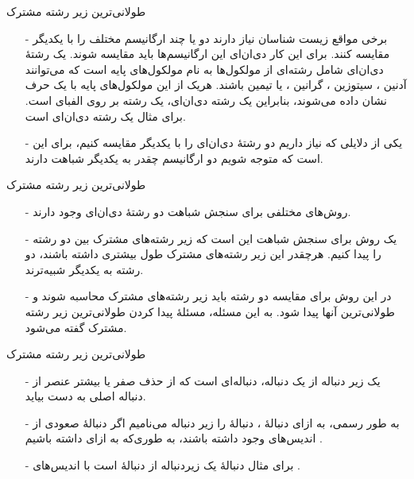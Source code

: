 
\begin{frame}{‌طولانی‌ترین زیر رشته مشترک}
\begin{itemize}\itemr
\item[-]
برخی مواقع زیست شناسان نیاز دارند دو یا چند ارگانیسم مختلف را با یکدیگر مقایسه کنند. برای این کار دی‌ان‌ای این ارگانیسم‌ها باید مقایسه شوند. یک رشتهٔ دی‌ان‌ای شامل رشته‌ای از مولکول‌ها به نام مولکول‌های پایه است که می‌توانند آدنین
، سیتوزین
، گرانین
، یا تیمین
باشند. هریک از این مولکول‌های پایه با یک حرف نشان داده می‌شوند، بنابراین یک رشته دی‌ان‌ای، یک رشته بر روی الفبای
است. برای مثال
یک رشته دی‌ان‌ای است.
\item[-]
یکی از دلایلی که نیاز داریم دو رشتهٔ دی‌ان‌ای را با یکدیگر مقایسه کنیم، برای این است که متوجه شویم دو ارگانیسم چقدر به یکدیگر شباهت دارند.
\end{itemize}
\end{frame}


\begin{frame}{‌طولانی‌ترین زیر رشته مشترک}
\begin{itemize}\itemr
\item[-]
روش‌های مختلفی برای سنجش شباهت دو رشتهٔ دی‌ان‌ای وجود دارند.
\item[-]
یک روش برای سنجش شباهت این است که زیر رشته‌های مشترک بین دو رشته را پیدا کنیم. هرچقدر این زیر رشته‌های مشترک طول بیشتری داشته باشند، دو رشته به یکدیگر شبیه‌ترند.
\item[-]
در این روش برای مقایسه دو رشته باید زیر رشته‌های مشترک محاسبه شوند و طولانی‌ترین آنها پیدا شود. به این مسئله، مسئلهٔ پیدا کردن طولانی‌ترین زیر رشته مشترک
گفته می‌شود.
\end{itemize}
\end{frame}


\begin{frame}{‌طولانی‌ترین زیر رشته مشترک}
\begin{itemize}\itemr
\item[-]
یک زیر دنباله از یک دنباله، دنباله‌ای است که از حذف صفر یا بیشتر عنصر از دنباله اصلی به دست بیاید.
\item[-]
به طور رسمی، به ازای دنبالهٔ
، دنبالهٔ
را زیر دنباله
می‌نامیم اگر دنبالهٔ صعودی
از اندیس‌های
وجود داشته باشند، به طوری‌که به ازای
داشته باشیم
.
\item[-]
 برای مثال دنبالهٔ
 یک زیردنباله از دنبالهٔ
 است با اندیس‌های
 .
\end{itemize}
\end{frame}


